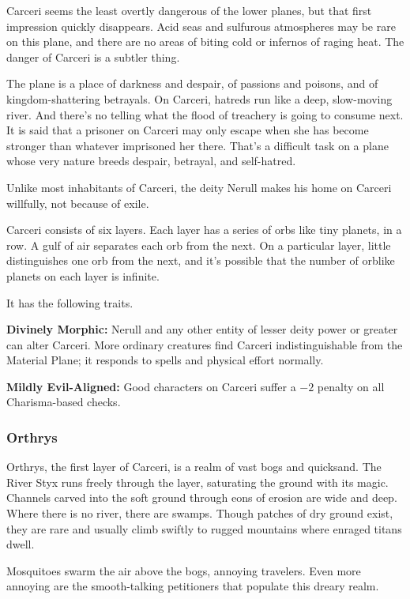 Carceri seems the least overtly dangerous of the lower planes, but that first impression quickly disappears. Acid seas and sulfurous atmospheres may be rare on this plane, and there are no areas of biting cold or infernos of raging heat. The danger of Carceri is a subtler thing.

The plane is a place of darkness and despair, of passions and poisons, and of kingdom-shattering betrayals. On Carceri, hatreds run like a deep, slow-moving river. And there's no telling what the flood of treachery is going to consume next. It is said that a prisoner on Carceri may only escape when she has become stronger than whatever imprisoned her there. That's a difficult task on a plane whose very nature breeds despair, betrayal, and self-hatred.

Unlike most inhabitants of Carceri, the deity Nerull makes his home on Carceri willfully, not because of exile.

Carceri consists of six layers. Each layer has a series of orbs like tiny planets, in a row. A gulf of air separates each orb from the next. On a particular layer, little distinguishes one orb from the next, and it's possible that the number of orblike planets on each layer is infinite.

It has the following traits.
\begin{itemize*}
\item \textbf{Divinely Morphic:} Nerull and any other entity of lesser deity power or greater can alter Carceri. More ordinary creatures find Carceri indistinguishable from the Material Plane; it responds to spells and physical effort normally.
\item \textbf{Mildly Evil-Aligned:} Good characters on Carceri suffer a $-2$ penalty on all Charisma-based checks.
\end{itemize*}

\subsubsection{Orthrys}
Orthrys, the first layer of Carceri, is a realm of vast bogs and quicksand. The River Styx runs freely through the layer, saturating the ground with its magic. Channels carved into the soft ground through eons of erosion are wide and deep. Where there is no river, there are swamps. Though patches of dry ground exist, they are rare and usually climb swiftly to rugged mountains where enraged titans dwell.

Mosquitoes swarm the air above the bogs, annoying travelers. Even more annoying are the smooth-talking petitioners that populate this dreary realm.

